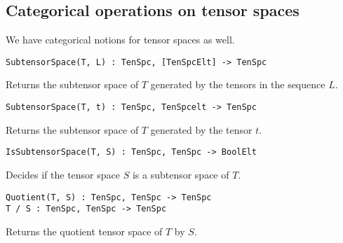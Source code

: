 \subsection{Categorical operations on tensor spaces}

We have categorical notions for tensor spaces as well.

\color{blue}
{\small \begin{verbatim}
SubtensorSpace(T, L) : TenSpc, [TenSpcElt] -> TenSpc
\end{verbatim} }
\color{black}

Returns the subtensor space of $T$ generated by the tensors in the sequence $L$.

\color{blue}
{\small \begin{verbatim}
SubtensorSpace(T, t) : TenSpc, TenSpcelt -> TenSpc
\end{verbatim} }
\color{black}

Returns the subtensor space of $T$ generated by the tensor $t$.

\color{blue}
{\small \begin{verbatim}
IsSubtensorSpace(T, S) : TenSpc, TenSpc -> BoolElt
\end{verbatim} }
\color{black}

Decides if the tensor space $S$ is a subtensor space of $T$.

\color{blue}
{\small \begin{verbatim}
Quotient(T, S) : TenSpc, TenSpc -> TenSpc
T / S : TenSpc, TenSpc -> TenSpc
\end{verbatim} }
\color{black}

Returns the quotient tensor space of $T$ by $S$.

